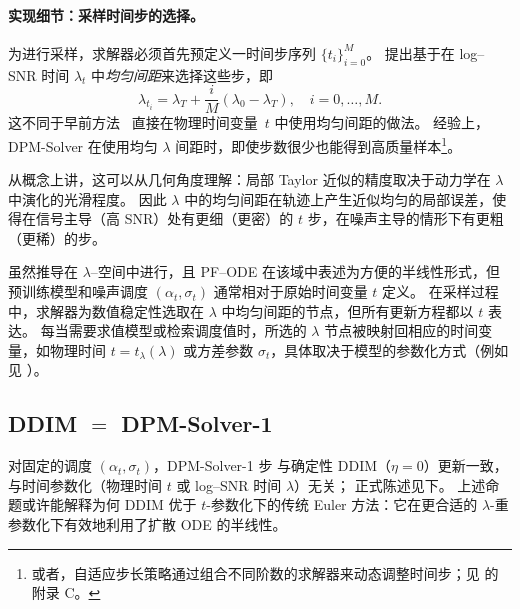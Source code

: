 \paragraph{实现细节：采样时间步的选择。} 为进行采样，求解器必须首先预定义一时间步序列 $\{t_i\}_{i=0}^M$。
\citet{lu2022dpm} 提出基于在 log--SNR 时间 $\lambda_t$ 中\emph{均匀间距}来选择这些步，即
\[
\lambda_{t_i} = \lambda_T + \frac{i}{M}(\lambda_0 - \lambda_T), \quad i = 0, \dots, M.
\]
这不同于早前方法~\citep{ho2020denoising,song2020score} 直接在物理时间变量~$t$ 中使用均匀间距的做法。
经验上，DPM-Solver 在使用均匀 $\lambda$ 间距时，即使步数很少也能得到高质量样本\footnote{或者，自适应步长策略通过组合不同阶数的求解器来动态调整时间步；见 \citet{lu2022dpm} 的附录 C。}。

从概念上讲，这可以从几何角度理解：局部 Taylor 近似的精度取决于动力学在 $\lambda$ 中演化的光滑程度。
因此 $\lambda$ 中的均匀间距在轨迹上产生近似均匀的局部误差，使得在信号主导（高 SNR）处有更细（更密）的 $t$ 步，在噪声主导的情形下有更粗（更稀）的步。



虽然推导在 $\lambda$--空间中进行，且 PF--ODE 在该域中表述为方便的半线性形式，但预训练模型和噪声调度 $(\alpha_t, \sigma_t)$ 通常相对于原始时间变量 $t$ 定义。
在采样过程中，求解器为数值稳定性选取在 $\lambda$ 中均匀间距的节点，但所有更新方程都以 $t$ 表达。
每当需要求值模型或检索调度值时，所选的 $\lambda$ 节点被映射回相应的时间变量，如物理时间 $t = t_\lambda(\lambda)$ 或方差参数 $\sigma_t$，具体取决于模型的参数化方式（例如见 ）。








\subsection{DDIM $=$ DPM-Solver-1}\label{subsec:ddim=dpm-solver-1}
对固定的调度 $(\alpha_t,\sigma_t)$，DPM-Solver-1 步
与确定性 DDIM（$\eta=0$）更新一致，
与时间参数化（物理时间 $t$ 或 log--SNR 时间 $\lambda$）无关；
正式陈述见下。
上述命题或许能解释为何 DDIM 优于 $t$-参数化下的传统 Euler 方法：它在更合适的 $\lambda$-重参数化下有效地利用了扩散 ODE 的半线性。


